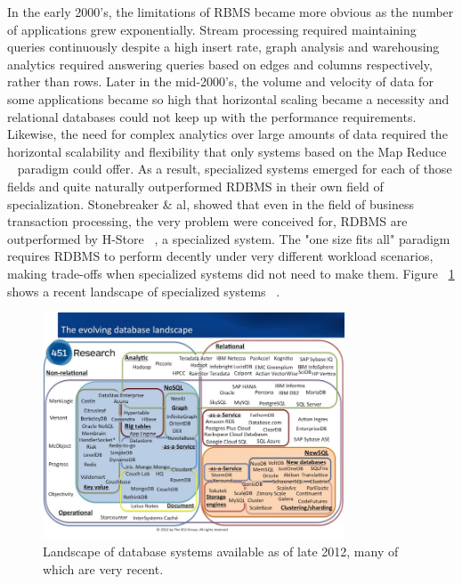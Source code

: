 In the early 2000's, the limitations of RBMS became more obvious as the number of applications grew exponentially. Stream processing required maintaining queries continuously despite a high insert rate, graph analysis and warehousing analytics required answering queries based on edges and columns respectively, rather than rows. Later in the mid-2000's, the volume and velocity of data for some applications became so high that horizontal scaling became a necessity and relational databases could not keep up with the performance requirements.
Likewise, the need for complex analytics over large amounts of data required the horizontal scalability and flexibility that only systems based on the Map Reduce ~\cite{Dean2008} paradigm could offer. As a result, specialized systems emerged for each of those fields and quite naturally outperformed RDBMS in their own field of specialization. Stonebreaker \& al, showed that even in the field of business transaction processing, the very problem were conceived for, RDBMS are outperformed by H-Store ~\cite{Stonebreaker2007}, a specialized system. The "one size fits all" paradigm requires RDBMS to perform decently under very different workload scenarios, making trade-offs when specialized systems did not need to make them. Figure ~\ref{fig:dblandscape} shows a recent landscape of specialized systems ~\cite{Aslett2012}.

\begin{figure}
 \centering
  \includegraphics[width=0.8\textwidth]{images/DBlandscape.jpg}
  \caption{Landscape of database systems available as of late 2012, many of which are very recent.}
  \label{fig:dblandscape}
\end{figure}


